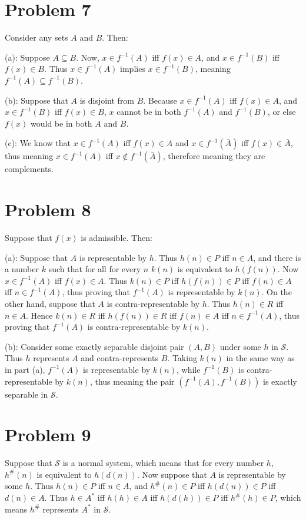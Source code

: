 \documentclass{article}
\theoremstyle{definition}
\begin{document}
\section*{Problem 7}
Consider any sets $A$ and $B$. Then:


(a): Suppose $A\subseteq B$. Now, $x\in f^{-1}(A)$ iff $f(x)\in A$, and $x\in f^{-1}(B)$ iff $f(x)\in B$. Thus $x\in f^{-1}(A)$ implies $x\in f^{-1}(B)$,  
meaning $f^{-1}(A)\subseteq f^{-1}(B)$.


(b): Suppose that $A$ is disjoint from $B$. Because $x\in f^{-1}(A)$ iff $f(x)\in A$, and $x\in f^{-1}(B)$ iff $f(x)\in B$, $x$ cannot be in both 
$f^{-1}(A)$ and $f^{-1}(B)$, or else $f(x)$ would be in both $A$ and $B$.


(c): We know that $x\in f^{-1}(A)$ iff $f(x)\in A$ and $x\in f^{-1}(\bar{A})$ iff $f(x)\in\bar{A}$, thus meaning 
$x\in f^{-1}(A)$ iff $x\notin f^{-1}(\bar{A})$, therefore meaning they are complements.

\section*{Problem 8}
Suppose that $f(x)$ is admissible. Then:


(a): Suppose that $A$ is representable by $h$. Thus $h(n)\in P$ iff $n\in A$, and there is a number $k$ such that for all for every $n$ $k(n)$ is equivalent to $h(f(n))$. 
Now $x\in f^{-1}(A)$ iff $f(x)\in A$. Thus $k(n)\in P$ iff $h(f(n))\in P$ iff $f(n)\in A$ iff $n\in f^{-1}(A)$, thus proving that $f^{-1}(A)$ is representable by 
$k(n)$. On the other hand, suppose that $A$ is contra-representable by $h$. Thus $h(n)\in R$ iff $n\in A$. Hence $k(n)\in R$ iff $h(f(n))\in R$ iff 
$f(n)\in A$ iff $n\in f^{-1}(A)$, thus proving that $f^{-1}(A)$ is contra-representable by $k(n)$.

(b): Consider some exactly separable disjoint pair $(A,B)$ under some $h$ in $\mathcal{S}$. 
Thus $h$ represents $A$ and contra-represents $B$. Taking $k(n)$ in the same way as in 
part (a), $f^{-1}(A)$ is representable by $k(n)$, while $f^{-1}(B)$ is contra-representable by $k(n)$, thus meaning the pair $(f^{-1}(A),f^{-1}(B))$ is exactly 
separable in $\mathcal{S}$.

\section*{Problem 9}
Suppose that $\mathcal{S}$ is a normal system, which means that for every number $h$, $h^\#(n)$ is equivalent to $h(d(n))$. Now suppose that $A$ is representable by 
some $h$. Thus $h(n)\in P$ iff $n\in A$, and $h^\#(n)\in P$ iff $h(d(n))\in P$ iff $d(n)\in A$. Thus $h\in A^*$ iff $h(h)\in A$ iff $h(d(h))\in P$ iff $h^\#(h)\in P$, 
which means $h^\#$ represents $A^*$ in $\mathcal{S}$.
\end{document}
